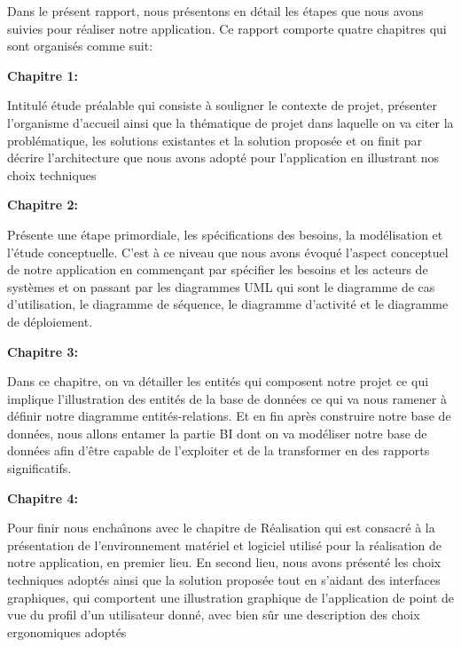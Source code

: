 \bigskip


Dans le pr\'{e}sent rapport, nous pr\'{e}sentons en d\'{e}tail les \'{e}tapes que nous avons
suivies pour r\'{e}aliser notre application. Ce rapport comporte quatre chapitres
qui sont organis\'{e}s comme suit:

\bigskip
\textbf{Chapitre 1:}

Intitul\'{e} \'{e}tude pr\'{e}alable qui consiste \`{a} souligner le contexte de projet,
pr\'{e}senter l'organisme d'accueil ainsi que la th\'{e}matique de projet dans
laquelle on va citer la probl\'{e}matique, les solutions existantes et la solution
propos\'{e}e et on finit par d\'{e}crire l'architecture que nous avons adopt\'{e} pour
l'application en illustrant nos choix techniques

\bigskip
\textbf{Chapitre 2:}

Pr\'{e}sente une \'{e}tape primordiale, les sp\'{e}cifications des besoins, la mod\'{e}lisation
et l'\'{e}tude conceptuelle. C'est \`{a} ce niveau que nous avons \'{e}voqu\'{e} l'aspect
conceptuel de notre application en commen\c{c}ant par sp\'{e}cifier les besoins et les
acteurs de syst\`{e}mes et on passant par les diagrammes UML qui sont le
diagramme de cas d'utilisation, le diagramme de s\'{e}quence, le diagramme
d'activit\'{e} et le diagramme de d\'{e}ploiement.

\bigskip
\textbf{Chapitre 3:}

Dans ce chapitre, on va d\'{e}tailler les entit\'{e}s qui composent notre projet ce qui
implique l'illustration des entit\'{e}s de la base de donn\'{e}es ce qui va nous
ramener \`{a} d\'{e}finir notre diagramme entit\'{e}s-relations.
Et en fin apr\`{e}s construire notre base de donn\'{e}es, nous allons entamer la partie
BI dont on va mod\'{e}liser notre base de donn\'{e}es afin d'\^{e}tre capable de
l'exploiter et de la transformer en des rapports significatifs.

\bigskip
\textbf{Chapitre 4:}

Pour finir nous encha\^{\i}nons avec le chapitre de R\'{e}alisation qui est consacr\'{e} \`{a} la
pr\'{e}sentation de l'environnement mat\'{e}riel et logiciel utilis\'{e} pour la r\'{e}alisation
de notre application, en premier lieu. En second lieu, nous avons pr\'{e}sent\'{e} les
choix techniques adopt\'{e}s ainsi que la solution propos\'{e}e tout en s'aidant des
interfaces graphiques, qui comportent une illustration graphique de
l'application de point de vue du profil d'un utilisateur donn\'{e}, avec bien s\^{u}r une
description des choix ergonomiques adopt\'{e}s






